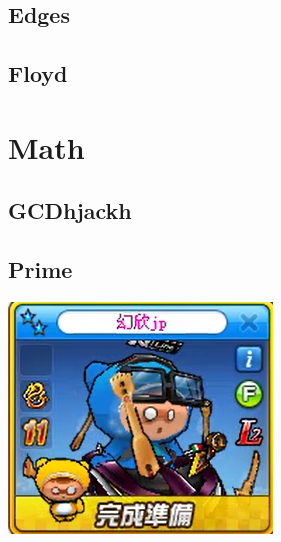     \subsection{Edges}
            
    \subsection{Floyd}
        

\section{Math}
    \subsection{GCDhjackh}
        
    \subsection{Prime}
        
\includegraphics{Contents/runrun.png}